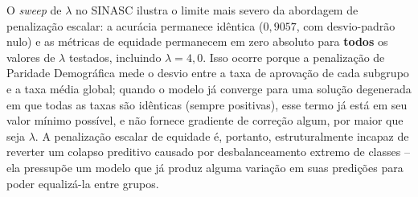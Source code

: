 \begin{table}[H]
    \centering
    \caption{SINASC: Efeito da penalização de viés na FairMLP (lambda sweep).}
    \vspace{2mm}
    \label{tab:sinasc_lambda_sweep}
\end{table}

O \textit{sweep} de $\lambda$ no SINASC ilustra o limite mais severo da abordagem de penalização escalar: a acurácia permanece idêntica ($0,9057$, com desvio-padrão nulo) e as métricas de equidade permanecem em zero absoluto para \textbf{todos} os valores de $\lambda$ testados, incluindo $\lambda = 4,0$. Isso ocorre porque a penalização de Paridade Demográfica mede o desvio entre a taxa de aprovação de cada subgrupo e a taxa média global; quando o modelo já converge para uma solução degenerada em que todas as taxas são idênticas (sempre positivas), esse termo já está em seu valor mínimo possível, e não fornece gradiente de correção algum, por maior que seja $\lambda$. A penalização escalar de equidade é, portanto, estruturalmente incapaz de reverter um colapso preditivo causado por desbalanceamento extremo de classes -- ela pressupõe um modelo que já produz alguma variação em suas predições para poder equalizá-la entre grupos.

